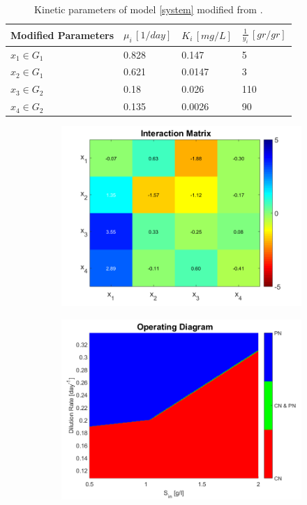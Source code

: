 \documentclass[3p,times]{elsarticle}
\begin{document}
\begin{table}[ht]
	\centering
	\begin{tabular}{|l|l|l|l|}
		\hline
		Modified Parameters  & $\mu_i\,[1/day]$ & $K_i\,[mg/L]$ & $\frac{1}{y_i} \, [gr/gr]$ \\ \hline
		$x_1 \in G_1$ &0.828  &0.147  & 5 \\ \hline
		$x_2\in G_1$ & 0.621 & 0.0147 & 3 \\ \hline
		$x_3\in G_2$ & 0.18 & 0.026 & 110 \\ \hline
		$x_4\in G_2$ & 0.135& 0.0026& 90 \\ \hline
	\end{tabular}
	\caption{Kinetic parameters of model \eqref{system} modified from \cite{Dumont2016}.}
	\label{Parameters Modified}
\end{table}
\begin{figure}[ht]
	\centering	
	\begin{subfigure}[b]{0.45\textwidth}
		\includegraphics[width=\textwidth]{Interactions_Parameters_modifed}
	\end{subfigure}
	\begin{subfigure}[b]{0.45\textwidth}
		\includegraphics[width=\textwidth]{OD_parameters_modified}

\end{subfigure}
\end{figure}
\end{document}
